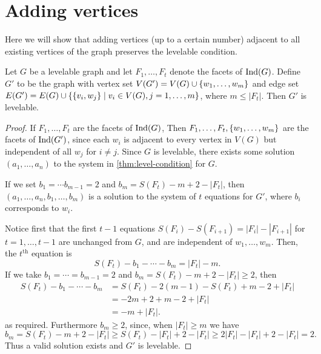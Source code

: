 \section{Adding vertices} \label{sec:adding-vertices-levelable}

Here we will show that adding vertices (up to a certain number) adjacent to all existing vertices of the graph preserves the levelable condition.

\begin{theorem} \label{thm:vertex-add}
Let $G$ be a levelable graph and let $F_1, \dots, F_t$ denote the facets of $\textrm{Ind}(G)$. Define $G'$ to be the graph with vertex set $V(G') = V(G) \cup \{ w_1, \dots, w_m \}$ and edge set $E(G') = E(G) \cup \{ \{ v_i, w_j \} \; | \; v_i \in V(G), j = 1, \dots, m \}$, where $m \leq |F_t|$. Then $G'$ is levelable.
\end{theorem}

\begin{proof}
If $F_1, \dots, F_t$ are the facets of $\textrm{Ind}(G)$, Then $F_1, \dots, F_t, \{ w_1, \dots, w_m \}$ are the facets of $\textrm{Ind}(G')$, since each $w_i$ is adjacent to every vertex in $V(G)$ but independent of all $w_j$ for $i \neq j$. Since $G$ is levelable, there exists some solution $(a_1, \dots, a_n)$ to the system in \autoref{thm:level-condition} for $G$.

If we set $b_1 = \cdots b_{m-1} = 2$ and $b_m = S(F_t) - m + 2 - |F_t|$, then $(a_1, \dots, a_n, \allowbreak b_1, \dots, b_m)$ is a solution to the system of $t$ equations for $G'$, where $b_i$ corresponds to $w_i$. 

Notice first that the first $t-1$ equations $S(F_i) - S(F_{i+1})  = |F_i| - |F_{i+1}|$ for $t = 1, \dots, t-1$ are unchanged from $G$, and are independent of $w_1, \dots, w_m$. Then, the $t^{\textrm{th}}$ equation is 
$$
S(F_t) - b_1 - \cdots - b_m = |F_t| - m.
$$
If we take $b_1 = \cdots = b_{m-1} = 2$ and $b_m = S(F_t) - m + 2 - |F_t| \geq 2$, then
\begin{equation*}
\begin{aligned}
S(F_t) - b_1 - \cdots - b_m &= S(F_t) - 2(m-1) - S(F_t) + m - 2 + |F_t| \\ &= -2m + 2  + m  - 2 +| F_t| \\&= -m + |F_t|.
\end{aligned}
\end{equation*}
as required. Furthermore $b_m \geq 2$, since, when $|F_t| \geq m$ we have
$$
b_m = S(F_t) - m + 2 - |F_t| \geq S(F_t) - |F_t| + 2 - |F_t| \geq 2|F_t| - |F_t| + 2 - |F_t| = 2.
$$
Thus a valid solution exists and $G'$ is levelable.
\end{proof}

